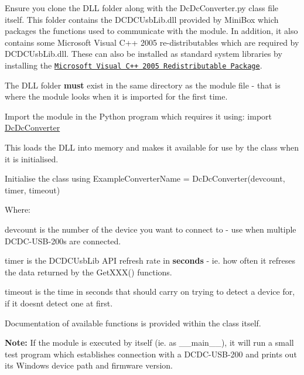 \begin{DoxyEnumerate}
\item Ensure you clone the \textquotesingle{}D\+LL\textquotesingle{} folder along with the Dc\+Dc\+Converter.\+py class file itself. This folder contains the D\+C\+D\+C\+Usb\+Lib.\+dll provided by Mini\+Box which packages the functions used to communicate with the module. In addition, it also contains some Microsoft Visual C++ 2005 re-\/distributables which are required by D\+C\+D\+C\+Usb\+Lib.\+dll. These can also be installed as standard system libraries by installing the \href{https://www.microsoft.com/en-us/download/details.aspx?id=3387}{\tt Microsoft Visual C++ 2005 Redistributable Package}.

The \textquotesingle{}D\+LL\textquotesingle{} folder {\bfseries must} exist in the same directory as the module file -\/ that is where the module looks when it is imported for the first time.
\item Import the module in the Python program which requires it using\+: {\ttfamily import \hyperlink{namespace_dc_dc_converter}{Dc\+Dc\+Converter}}

This loads the D\+LL into memory and makes it available for use by the class when it is initialised.
\item Initialise the class using {\ttfamily Example\+Converter\+Name = Dc\+Dc\+Converter(devcount, timer, timeout)}

Where\+:
\begin{DoxyItemize}
\item {\ttfamily devcount} is the number of the device you want to connect to -\/ use when multiple D\+C\+D\+C-\/\+U\+S\+B-\/200s are connected.
\item {\ttfamily timer} is the D\+C\+D\+C\+Usb\+Lib A\+PI refresh rate in {\bfseries seconds} -\/ ie. how often it refreses the data returned by the {\ttfamily Get\+X\+X\+X()} functions.
\item {\ttfamily timeout} is the time in seconds that should carry on trying to detect a device for, if it doesn\textquotesingle{}t detect one at first.
\end{DoxyItemize}
\end{DoxyEnumerate}

Documentation of available functions is provided within the class itself.

{\bfseries Note\+:} If the module is executed by itself (ie. as \+\_\+\+\_\+main\+\_\+\+\_\+), it will run a small test program which establishes connection with a D\+C\+D\+C-\/\+U\+S\+B-\/200 and prints out its Windows device path and firmware version. 